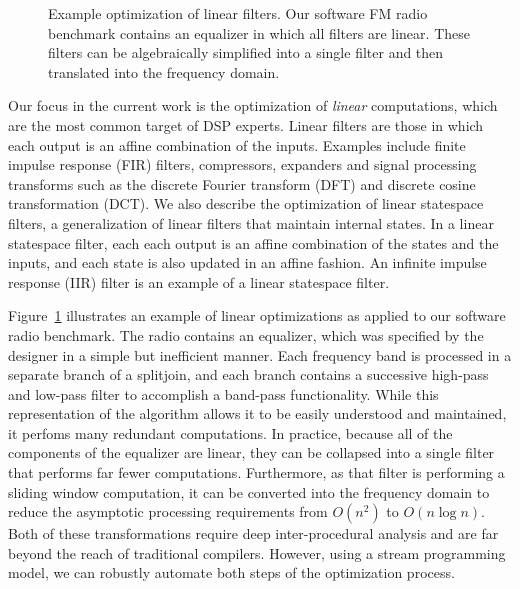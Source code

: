 \begin{figure}[t]
\caption[Example optimization of linear filters]{Example optimization
  of linear filters.  Our software FM radio benchmark contains an
  equalizer in which all filters are linear.  These filters can be
  algebraically simplified into a single filter and then translated
  into the frequency domain. \protect\label{fig:equalizer}}
\end{figure}

Our focus in the current work is the optimization of {\it linear}
computations, which are the most common target of DSP experts.  Linear
filters are those in which each output is an affine combination of the
inputs.  Examples include finite impulse response (FIR) filters,
compressors, expanders and signal processing transforms such as the
discrete Fourier transform (DFT) and discrete cosine transformation
(DCT).  We also describe the optimization of linear statespace
filters, a generalization of linear filters that maintain internal
states.  In a linear statespace filter, each each output is an affine
combination of the states and the inputs, and each state is also
updated in an affine fashion.  An infinite impulse response (IIR)
filter is an example of a linear statespace filter.

Figure~\ref{fig:equalizer} illustrates an example of linear
optimizations as applied to our software radio benchmark.  The radio
contains an equalizer, which was specified by the designer in a simple
but inefficient manner.  Each frequency band is processed in a
separate branch of a splitjoin, and each branch contains a successive
high-pass and low-pass filter to accomplish a band-pass functionality.
While this representation of the algorithm allows it to be easily
understood and maintained, it perfoms many redundant computations.  In
practice, because all of the components of the equalizer are linear,
they can be collapsed into a single filter that performs far fewer
computations.  Furthermore, as that filter is performing a sliding
window computation, it can be converted into the frequency domain to
reduce the asymptotic processing requirements from $O(n^2)$ to $O(n
\log n)$.  Both of these transformations require deep inter-procedural
analysis and are far beyond the reach of traditional compilers.
However, using a stream programming model, we can robustly automate
both steps of the optimization process.

